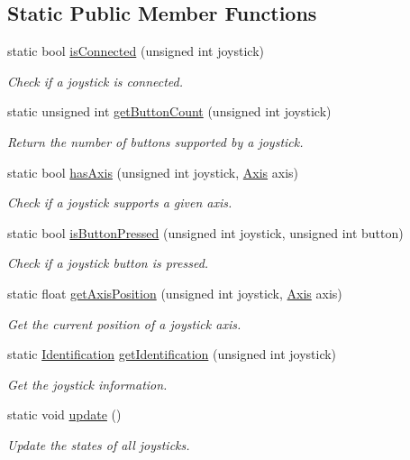 \subsection*{Static Public Member Functions}
\begin{DoxyCompactItemize}
\item 
static bool \hyperlink{classsf_1_1_joystick_ac7d4e1923e9f9420174f26703ea63d6c}{is\+Connected} (unsigned int joystick)
\begin{DoxyCompactList}\small\item\em Check if a joystick is connected. \end{DoxyCompactList}\item 
static unsigned int \hyperlink{classsf_1_1_joystick_a4de9f445c6582bfe9f0873f695682885}{get\+Button\+Count} (unsigned int joystick)
\begin{DoxyCompactList}\small\item\em Return the number of buttons supported by a joystick. \end{DoxyCompactList}\item 
static bool \hyperlink{classsf_1_1_joystick_a268e8f2a11ae6af4a47c727cb4ab4d95}{has\+Axis} (unsigned int joystick, \hyperlink{classsf_1_1_joystick_a48db337092c2e263774f94de6d50baa7}{Axis} axis)
\begin{DoxyCompactList}\small\item\em Check if a joystick supports a given axis. \end{DoxyCompactList}\item 
static bool \hyperlink{classsf_1_1_joystick_ae0d97a4b84268cbe6a7078e1b2717835}{is\+Button\+Pressed} (unsigned int joystick, unsigned int button)
\begin{DoxyCompactList}\small\item\em Check if a joystick button is pressed. \end{DoxyCompactList}\item 
static float \hyperlink{classsf_1_1_joystick_aea4930193331df1851b709f3060ba58b}{get\+Axis\+Position} (unsigned int joystick, \hyperlink{classsf_1_1_joystick_a48db337092c2e263774f94de6d50baa7}{Axis} axis)
\begin{DoxyCompactList}\small\item\em Get the current position of a joystick axis. \end{DoxyCompactList}\item 
static \hyperlink{structsf_1_1_joystick_1_1_identification}{Identification} \hyperlink{classsf_1_1_joystick_aa917c9435330e6e0368d3893672d1b74}{get\+Identification} (unsigned int joystick)
\begin{DoxyCompactList}\small\item\em Get the joystick information. \end{DoxyCompactList}\item 
static void \hyperlink{classsf_1_1_joystick_ab85fa9175b4edd3e5a07ee3cde0b0f48}{update} ()
\begin{DoxyCompactList}\small\item\em Update the states of all joysticks. \end{DoxyCompactList}\end{DoxyCompactItemize}


